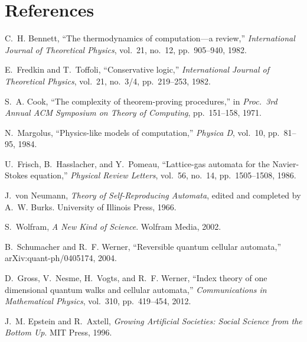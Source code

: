 \documentclass[11pt,a4paper]{article}
\begin{document}
\section*{References}

\begin{enumerate}[label={[\arabic*]}, leftmargin=*, itemsep=2pt]
    \item \label{ref:bennett} C.~H. Bennett, ``The thermodynamics of computation---a review,'' \emph{International Journal of Theoretical Physics}, vol.~21, no.~12, pp.~905--940, 1982.

    \item \label{ref:fredkin} E.~Fredkin and T.~Toffoli, ``Conservative logic,'' \emph{International Journal of Theoretical Physics}, vol.~21, no.~3/4, pp.~219--253, 1982.

    \item \label{ref:cook} S.~A. Cook, ``The complexity of theorem-proving procedures,'' in \emph{Proc.\ 3rd Annual ACM Symposium on Theory of Computing}, pp.~151--158, 1971.

    \item \label{ref:margolus} N.~Margolus, ``Physics-like models of computation,'' \emph{Physica D}, vol.~10, pp.~81--95, 1984.

    \item \label{ref:fhp} U.~Frisch, B.~Hasslacher, and Y.~Pomeau, ``Lattice-gas automata for the Navier-Stokes equation,'' \emph{Physical Review Letters}, vol.~56, no.~14, pp.~1505--1508, 1986.

    \item \label{ref:vonneumann} J.~von Neumann, \emph{Theory of Self-Reproducing Automata}, edited and completed by A.~W. Burks. University of Illinois Press, 1966.

    \item \label{ref:wolfram} S.~Wolfram, \emph{A New Kind of Science}. Wolfram Media, 2002.

    \item \label{ref:sw} B.~Schumacher and R.~F. Werner, ``Reversible quantum cellular automata,'' arXiv:quant-ph/0405174, 2004.

    \item \label{ref:gross} D.~Gross, V.~Nesme, H.~Vogts, and R.~F. Werner, ``Index theory of one dimensional quantum walks and cellular automata,'' \emph{Communications in Mathematical Physics}, vol.~310, pp.~419--454, 2012.

    \item \label{ref:epstein} J.~M. Epstein and R.~Axtell, \emph{Growing Artificial Societies: Social Science from the Bottom Up}. MIT Press, 1996.


\end{enumerate}
\end{document}

